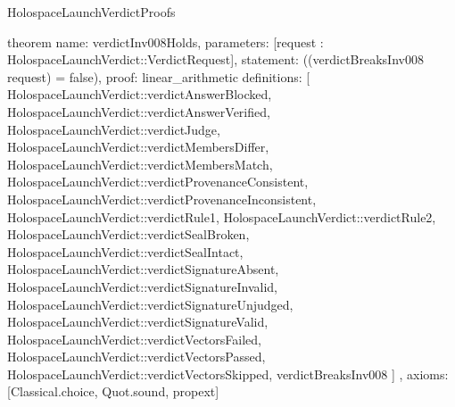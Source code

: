 \begin{lexlean}{HolospaceLaunchVerdictProofs}
\begin{semanticmodule}
theorem{
  name: verdictInv008Holds,
  parameters: [request : HolospaceLaunchVerdict::VerdictRequest],
  statement: ((verdictBreaksInv008 request) = false),
  proof: linear_arithmetic{
    definitions: [
      HolospaceLaunchVerdict::verdictAnswerBlocked,
      HolospaceLaunchVerdict::verdictAnswerVerified,
      HolospaceLaunchVerdict::verdictJudge,
      HolospaceLaunchVerdict::verdictMembersDiffer,
      HolospaceLaunchVerdict::verdictMembersMatch,
      HolospaceLaunchVerdict::verdictProvenanceConsistent,
      HolospaceLaunchVerdict::verdictProvenanceInconsistent,
      HolospaceLaunchVerdict::verdictRule1,
      HolospaceLaunchVerdict::verdictRule2,
      HolospaceLaunchVerdict::verdictSealBroken,
      HolospaceLaunchVerdict::verdictSealIntact,
      HolospaceLaunchVerdict::verdictSignatureAbsent,
      HolospaceLaunchVerdict::verdictSignatureInvalid,
      HolospaceLaunchVerdict::verdictSignatureUnjudged,
      HolospaceLaunchVerdict::verdictSignatureValid,
      HolospaceLaunchVerdict::verdictVectorsFailed,
      HolospaceLaunchVerdict::verdictVectorsPassed,
      HolospaceLaunchVerdict::verdictVectorsSkipped,
      verdictBreaksInv008
    ]
  },
  axioms: [Classical.choice, Quot.sound, propext]
}
\end{semanticmodule}
\end{lexlean}
